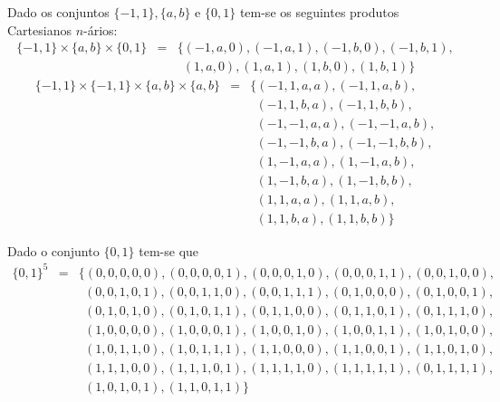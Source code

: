 \begin{exemplo}\label{exe:CartesianoNario1}
	Dado os conjuntos $\{-1, 1\}, \{a, b\}$ e $\{0, 1\}$ tem-se os seguintes produtos Cartesianos $n$-ários:
	\begin{eqnarray*}
		\{-1, 1\} \times \{a, b\} \times \{0, 1\} & = & \{(-1, a, 0), (-1, a, 1), (-1, b, 0), (-1, b, 1), \\
		& & \ \ (1, a, 0), (1, a, 1), (1, b, 0), (1, b, 1)\}
	\end{eqnarray*}
	\begin{eqnarray*}
		\{-1, 1\} \times \{-1, 1\} \times \{a, b\} \times \{a, b\} & = & \{ (-1, 1, a, a), (-1, 1, a, b), \\
		& & \ \ (-1, 1, b, a),  (-1, 1, b, b), \\
		& & \ \ (-1, -1, a, a), (-1, -1, a, b),\\
		& & \ \ (-1, -1, b, a), (-1, -1, b, b),\\
		& & \ \ (1, -1, a, a),  (1, -1, a, b),\\
		& & \ \ (1, -1, b, a),  (1, -1, b, b),\\
		& & \ \ (1, 1, a, a),   (1, 1, a, b),\\
		& & \ \ (1, 1, b, a),   (1, 1, b, b) \}
	\end{eqnarray*}
\end{exemplo}

\begin{exemplo}\label{exe:CartesianoNario2}
	Dado o conjunto $\{0,1\}$ tem-se que 
	\begin{eqnarray*}
		\{0, 1\}^5 & = & \{ (0, 0, 0, 0, 0), (0, 0, 0, 0, 1), (0, 0, 0, 1, 0), (0, 0, 0, 1, 1), (0, 0, 1, 0, 0),\\ 
    & & \ \ (0, 0, 1, 0, 1),(0, 0, 1, 1, 0), (0, 0, 1, 1, 1), (0, 1, 0, 0, 0), (0, 1, 0, 0, 1),\\ 
    & & \ \ (0, 1, 0, 1, 0), (0, 1, 0, 1, 1),(0, 1, 1, 0, 0), (0, 1, 1, 0, 1), (0, 1, 1, 1, 0),\\ 
    & & \ \ (1, 0, 0, 0, 0), (1, 0, 0, 0, 1),(1, 0, 0, 1, 0), (1, 0, 0, 1, 1), (1, 0, 1, 0, 0),\\
    & & \ \ (1, 0, 1, 1, 0), (1, 0, 1, 1, 1),(1, 1, 0, 0, 0), (1, 1, 0, 0, 1), (1, 1, 0, 1, 0),\\
    & & \ \ (1, 1, 1, 0, 0), (1, 1, 1, 0, 1), (1, 1, 1, 1, 0), (1, 1, 1, 1, 1), (0, 1, 1, 1, 1),\\
    & & \ \ (1, 0, 1, 0, 1), (1, 1, 0, 1, 1) \}
	\end{eqnarray*}
\end{exemplo}

